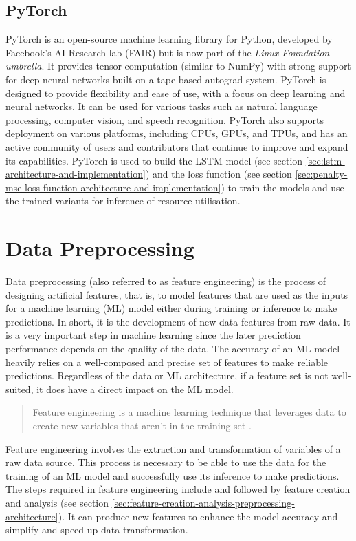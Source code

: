     \subsection{PyTorch}
    \label{sec:pytorch-third-party}
      PyTorch \cite{the-linux-foundationPyTorch} is an open-source machine learning library for Python, developed by Facebook's AI Research lab (FAIR) but is now part of the \emph{Linux Foundation umbrella}. It provides tensor computation (similar to NumPy) with strong support for deep neural networks built on a tape-based autograd system. PyTorch is designed to provide flexibility and ease of use, with a focus on deep learning and neural networks. It can be used for various tasks such as natural language processing, computer vision, and speech recognition.
      PyTorch also supports deployment on various platforms, including CPUs, GPUs, and TPUs, and has an active community of users and contributors that continue to improve and expand its capabilities.
      PyTorch is used to build the LSTM model (see section \ref{sec:lstm-architecture-and-implementation}) and the loss function (see section \ref{sec:penalty-mse-loss-function-architecture-and-implementation}) to train the models and use the trained variants for inference of resource utilisation.


  \section{Data Preprocessing}
  \label{sec:feature-engineering-data-preprocessing-architecture}

    Data preprocessing (also referred to as feature engineering) is the process of designing artificial features, that is, to model features that are used as the inputs for a machine learning (ML) model either during training or inference to make predictions. In short, it is the development of new data features from raw data.
    It is a very important step in machine learning since the later prediction performance depends on the quality of the data.
    The accuracy of an ML model heavily relies on a well-composed and precise set of features to make reliable predictions. Regardless of the data or ML architecture, if a feature set is not well-suited, it does have a direct impact on the ML model.
    \begin{quote}
      Feature engineering is a machine learning technique that leverages data to create new variables that aren't in the training set \cite{patelWhatFeatureEngineering2021}.
    \end{quote}
    Feature engineering involves the extraction and transformation of variables of a raw data source. This process is necessary to be able to use the data for the training of an ML model and successfully use its inference to make predictions.
    The steps required in feature engineering include  and  followed by feature creation and analysis (see section \ref{sec:feature-creation-analysis-preprocessing-architecture}).
    It can produce new features to enhance the model accuracy and simplify and speed up data transformation.

